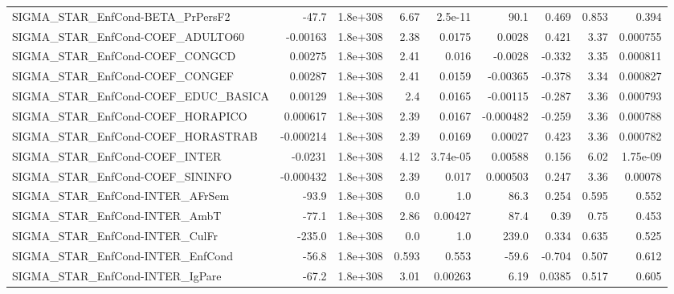 \begin{tabular}{lrrrrrrrr}
SIGMA\_STAR\_EnfCond-BETA\_PrPersF2      &       -47.7 &     1.8e+308 &    6.67 &  2.5e-11 &       90.1 &       0.469 &        0.853 &         0.394 \\
SIGMA\_STAR\_EnfCond-COEF\_ADULTO60      &    -0.00163 &     1.8e+308 &    2.38 &   0.0175 &     0.0028 &       0.421 &         3.37 &      0.000755 \\
SIGMA\_STAR\_EnfCond-COEF\_CONGCD        &     0.00275 &     1.8e+308 &    2.41 &    0.016 &    -0.0028 &      -0.332 &         3.35 &      0.000811 \\
SIGMA\_STAR\_EnfCond-COEF\_CONGEF        &     0.00287 &     1.8e+308 &    2.41 &   0.0159 &   -0.00365 &      -0.378 &         3.34 &      0.000827 \\
SIGMA\_STAR\_EnfCond-COEF\_EDUC\_BASICA   &     0.00129 &     1.8e+308 &     2.4 &   0.0165 &   -0.00115 &      -0.287 &         3.36 &      0.000793 \\
SIGMA\_STAR\_EnfCond-COEF\_HORAPICO      &    0.000617 &     1.8e+308 &    2.39 &   0.0167 &  -0.000482 &      -0.259 &         3.36 &      0.000788 \\
SIGMA\_STAR\_EnfCond-COEF\_HORASTRAB     &   -0.000214 &     1.8e+308 &    2.39 &   0.0169 &    0.00027 &       0.423 &         3.36 &      0.000782 \\
SIGMA\_STAR\_EnfCond-COEF\_INTER         &     -0.0231 &     1.8e+308 &    4.12 & 3.74e-05 &    0.00588 &       0.156 &         6.02 &      1.75e-09 \\
SIGMA\_STAR\_EnfCond-COEF\_SININFO       &   -0.000432 &     1.8e+308 &    2.39 &    0.017 &   0.000503 &       0.247 &         3.36 &       0.00078 \\
SIGMA\_STAR\_EnfCond-INTER\_AFrSem       &       -93.9 &     1.8e+308 &     0.0 &      1.0 &       86.3 &       0.254 &        0.595 &         0.552 \\
SIGMA\_STAR\_EnfCond-INTER\_AmbT         &       -77.1 &     1.8e+308 &    2.86 &  0.00427 &       87.4 &        0.39 &         0.75 &         0.453 \\
SIGMA\_STAR\_EnfCond-INTER\_CulFr        &      -235.0 &     1.8e+308 &     0.0 &      1.0 &      239.0 &       0.334 &        0.635 &         0.525 \\
SIGMA\_STAR\_EnfCond-INTER\_EnfCond      &       -56.8 &     1.8e+308 &   0.593 &    0.553 &      -59.6 &      -0.704 &        0.507 &         0.612 \\
SIGMA\_STAR\_EnfCond-INTER\_IgPare       &       -67.2 &     1.8e+308 &    3.01 &  0.00263 &       6.19 &      0.0385 &        0.517 &         0.605 \\

\end{tabular}

